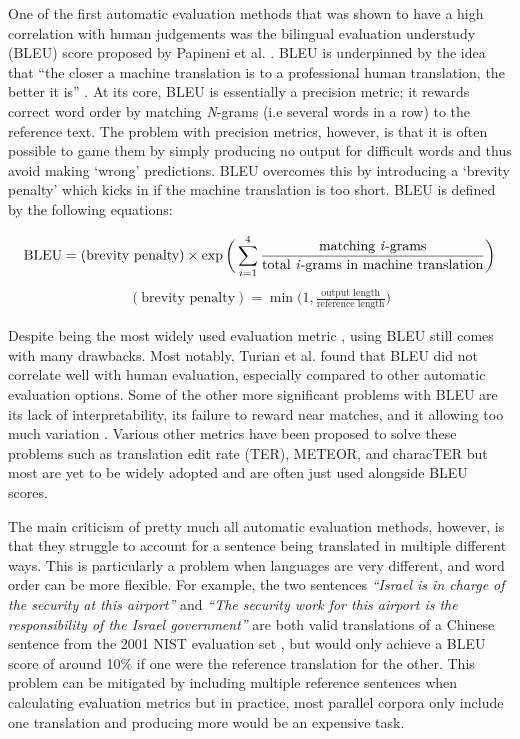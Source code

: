 \documentclass[11pt]{article}
\begin{document}
\bigskip

One of the first automatic evaluation methods that was shown to have a high correlation with human judgements was the bilingual evaluation understudy (BLEU) score proposed by Papineni et al. \citeyearpar{papineni-etal-2002-bleu}. BLEU is underpinned by the idea that “the closer a machine translation is to a professional human translation, the better it is” \citep[p. 311]{papineni-etal-2002-bleu}. At its core, BLEU is essentially a precision metric; it rewards correct word order by matching \textit{N}-grams (i.e several words in a row) to the reference text. The problem with precision metrics, however, is that it is often possible to game them by simply producing no output for difficult words and thus avoid making `wrong' predictions. BLEU overcomes this by introducing a ‘brevity penalty’ which kicks in if the machine translation is too short. BLEU is defined by the following equations:

\begin{align}
    \textrm{BLEU} = (\textrm{brevity penalty}) \times \exp \bigg( \sum_{i=1}^4 \frac{\textrm{matching \textit{i}-grams}}{\textrm{total \textit{i}-grams in machine translation}} \bigg)
\end{align}
\begin{align}
    (\textrm{brevity penalty}) = \min\bigg(1, \frac{\textrm{output length}}{\textrm{reference length}}\bigg)
\end{align}

Despite being the most widely used evaluation metric \citep[ch. 4]{koehn2020}, using BLEU still comes with many drawbacks. Most notably, Turian et al. \citeyearpar{turian2006evaluation} found that BLEU did not correlate well with human evaluation, especially compared to other automatic evaluation options. Some of the other more significant problems with BLEU are its lack of interpretability, its failure to reward near matches, and it allowing too much variation \citep{ananthakrishnan2007some}. Various other metrics have been proposed to solve these problems such as translation edit rate (TER), METEOR, and characTER but most are yet to be widely adopted and are often just used alongside BLEU scores.

\bigskip

The main criticism of pretty much all automatic evaluation methods, however, is that they struggle to account for a sentence being translated in multiple different ways. This is particularly a problem when languages are very different, and word order can be more flexible. For example, the two sentences \textit{“Israel is in charge of the security at this airport”} and \textit{“The security work for this airport is the responsibility of the Israel government”} are both valid translations of a Chinese sentence from the 2001 NIST evaluation set \citep{koehn2011better}, but would only achieve a BLEU score of around 10\% if one were the reference translation for the other. This problem can be mitigated by including multiple reference sentences when calculating evaluation metrics but in practice, most parallel corpora only include one translation and producing more would be an expensive task.
\end{document}
